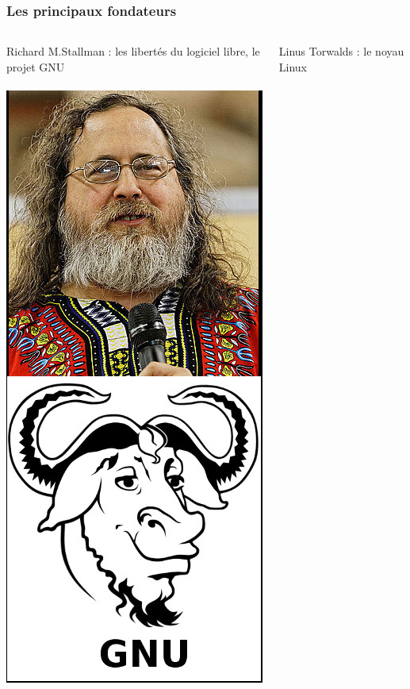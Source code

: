 \documentclass{beamer}
\begin{document}
\begin{frame}
\frametitle{Les principaux fondateurs}
\begin{columns}[c] 
\begin{center}
Richard M.Stallman : les libertés du logiciel libre, le projet GNU
\\~\\
\includegraphics[scale=1] {./images/rms.jpg} 
\end{center}
\begin{center}
Linus Torwalds : le noyau Linux \\~\\

\end{center}
\end{columns}
\end{frame}
\end{document}
